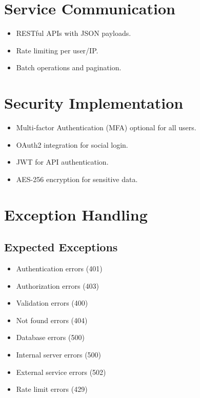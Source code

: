 \documentclass[a4paper, 11pt]{scrreprt}
\begin{document}
\section{Service Communication}
\begin{itemize}
    \item RESTful APIs with JSON payloads.
    \item Rate limiting per user/IP.
    \item Batch operations and pagination.
\end{itemize}

\section{Security Implementation}
\begin{itemize}
    \item Multi-factor Authentication (MFA) optional for all users.
    \item OAuth2 integration for social login.
    \item JWT for API authentication.
    \item AES-256 encryption for sensitive data.
\end{itemize}

\section{Exception Handling}
\subsection{Expected Exceptions}
\begin{itemize}
    \item Authentication errors (401)
    \item Authorization errors (403)
    \item Validation errors (400)
    \item Not found errors (404)
    \item Database errors (500)
    \item Internal server errors (500)
    \item External service errors (502)
    \item Rate limit errors (429)
\end{itemize}
\end{document}
